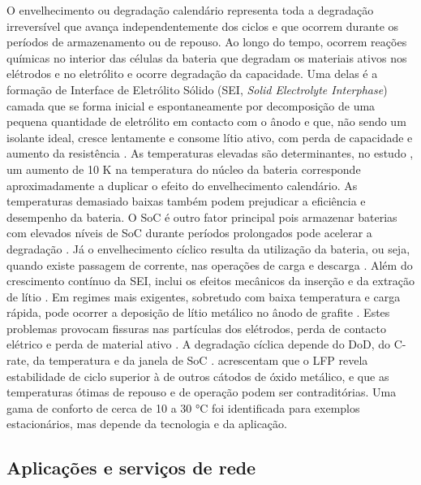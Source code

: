 O envelhecimento ou degradação calendário representa toda a degradação irreversível que avança independentemente dos ciclos e que ocorrem durante os períodos de armazenamento ou de repouso. Ao longo do tempo, ocorrem reações químicas no interior das células da bateria que degradam os materiais ativos nos elétrodos e no eletrólito e ocorre degradação da capacidade. Uma delas é a formação de Interface de Eletrólito Sólido (SEI, \textit{Solid Electrolyte Interphase}) camada que se forma inicial e espontaneamente por decomposição de uma pequena quantidade de eletrólito em contacto com o ânodo e que, não sendo um isolante ideal, cresce lentamente e consome lítio ativo, com perda de capacidade e aumento da resistência \cite{ Hesse2017}\cite{ Yarimca2024}\cite{Asiri2025 }. As temperaturas elevadas são determinantes, no estudo \cite{ Hesse2017}, um aumento de 10 K na temperatura do núcleo da bateria corresponde aproximadamente a duplicar o efeito do envelhecimento calendário. As temperaturas demasiado baixas também podem prejudicar a eficiência e desempenho da bateria. O SoC é outro fator principal pois armazenar baterias com elevados níveis de SoC durante períodos prolongados pode acelerar a degradação \cite{ Yarimca2024}\cite{Asiri2025 }. 
Já o envelhecimento cíclico resulta da utilização da bateria, ou seja, quando existe passagem de corrente, nas operações de carga e descarga \cite{ Raj2020}. Além do crescimento contínuo da SEI, inclui os efeitos mecânicos da inserção e da extração de lítio \cite{Arif2026 }. Em regimes mais exigentes, sobretudo com baixa temperatura e carga rápida, pode ocorrer a deposição de lítio metálico no ânodo de grafite \cite{ Hesse2017}. Estes problemas provocam fissuras nas partículas dos elétrodos, perda de contacto elétrico e perda de material ativo \cite{Madabattula2026 }. A degradação cíclica depende do DoD, do C-rate, da temperatura e da janela de SoC \cite{ Raj2020}\cite{Madabattula2026 }. \textcite{ Hesse2017} acrescentam que o LFP revela estabilidade de ciclo superior à de outros cátodos de óxido metálico, e que as temperaturas ótimas de repouso e de operação podem ser contraditórias. Uma gama de conforto de cerca de 10 a 30 °C foi identificada para exemplos estacionários, mas depende da tecnologia e da aplicação.

\subsection{Aplicações e serviços de rede}
\label{sec:Ch2.1.6}

